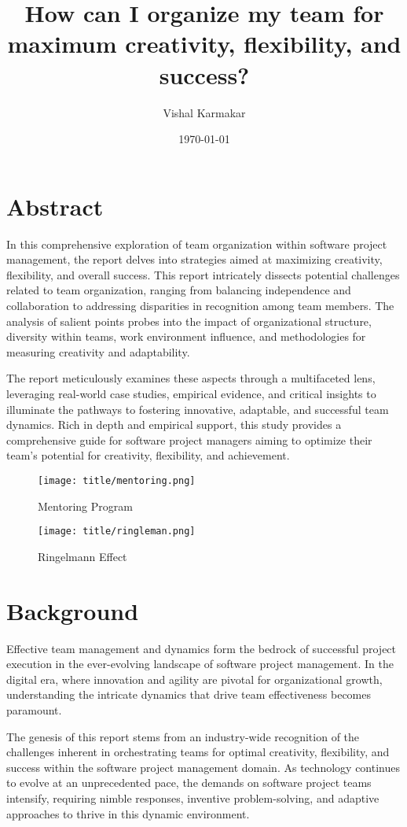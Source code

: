 \documentclass[a4paper, twoside]{article}
\date{\monthyeardate\today}
\author{Vishal  Karmakar}
\title{How can I organize my team
for maximum creativity, flexibility,
and success?}
\begin{document}

\tableofcontents
\newpage
\section{Abstract}
In this comprehensive exploration of team organization within software project management, the report delves into strategies aimed at maximizing creativity, flexibility, and overall success. This report intricately dissects potential challenges related to team organization, ranging from balancing independence and collaboration to addressing disparities in recognition among team members. The analysis of salient points probes into the impact of organizational structure, diversity within teams, work environment influence, and methodologies for measuring creativity and adaptability.

The report meticulously examines these aspects through a multifaceted lens, leveraging real-world case studies, empirical evidence, and critical insights to illuminate the pathways to fostering innovative, adaptable, and successful team dynamics. Rich in depth and empirical support, this study provides a comprehensive guide for software project managers aiming to optimize their team's potential for creativity, flexibility, and achievement.



\begin{figure}[h]
\centering
\begin{minipage}{.5\textwidth}
  \centering
  \texttt{[image: title/mentoring.png]}
  \caption{Mentoring Program}
  \label{fig:test1}
\end{minipage}%
\begin{minipage}{.5\textwidth}
  \centering
  \texttt{[image: title/ringleman.png]}
  \caption{Ringelmann Effect}
  \label{fig:test2}
\end{minipage}
\end{figure}

\section{Background}
Effective team management and dynamics form the bedrock of successful project execution in the ever-evolving landscape of software project management. In the digital era, where innovation and agility are pivotal for organizational growth, understanding the intricate dynamics that drive team effectiveness becomes paramount.

The genesis of this report stems from an industry-wide recognition of the challenges inherent in orchestrating teams for optimal creativity, flexibility, and success within the software project management domain. As technology continues to evolve at an unprecedented pace, the demands on software project teams intensify, requiring nimble responses, inventive problem-solving, and adaptive approaches to thrive in this dynamic environment.
\end{document}
